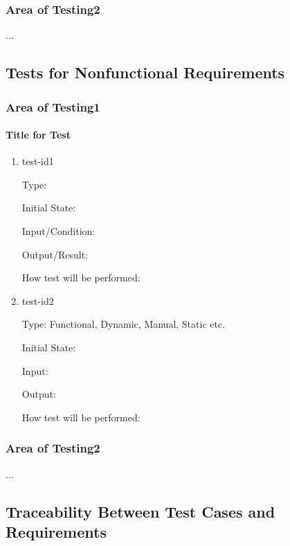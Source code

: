 \documentclass[12pt, titlepage]{article}
\begin{document}
\subsubsection{Area of Testing2}

...

\subsection{Tests for Nonfunctional Requirements}

\subsubsection{Area of Testing1}
        
\paragraph{Title for Test}

\begin{enumerate}

\item{test-id1\\}

Type: 
                    
Initial State: 
                    
Input/Condition: 
                    
Output/Result: 
                    
How test will be performed: 
                    
\item{test-id2\\}

Type: Functional, Dynamic, Manual, Static etc.
                    
Initial State: 
                    
Input: 
                    
Output: 
                    
How test will be performed: 

\end{enumerate}

\subsubsection{Area of Testing2}

...

\subsection{Traceability Between Test Cases and Requirements}
\end{document}
